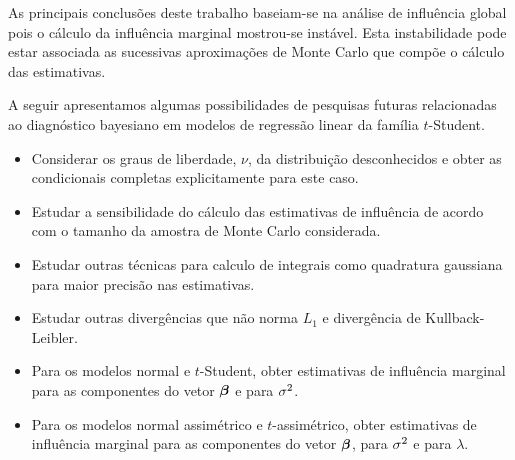 As principais conclusões deste trabalho baseiam-se na análise de influência global pois o cálculo da influência marginal mostrou-se instável. Esta instabilidade pode estar associada as sucessivas aproximações de Monte Carlo que compõe o cálculo das estimativas.

A seguir apresentamos algumas possibilidades de pesquisas futuras relacionadas ao diagnóstico bayesiano em modelos de regressão linear da família $t$-Student.

\begin{itemize}

\item Considerar os graus de liberdade, $\nu$, da distribuição desconhecidos e obter as condicionais completas explicitamente para este caso.

\item Estudar a sensibilidade do cálculo das estimativas de influência de acordo com o tamanho da amostra de Monte Carlo considerada.

\item Estudar outras técnicas para calculo de integrais como quadratura gaussiana para maior precisão nas estimativas.

\item Estudar outras divergências que não norma $L_1$ e divergência de Kullback-Leibler.

\item Para os modelos normal e $t$-Student, obter estimativas de influência marginal para as componentes do vetor ${\boldsymbol{\beta}}$ e para $\sigma^2$.

\item Para os modelos normal assimétrico e $t$-assimétrico, obter estimativas de influência marginal para as componentes do vetor ${\boldsymbol{\beta}}$, para $\sigma^2$ e para $\lambda$.

\end{itemize}
